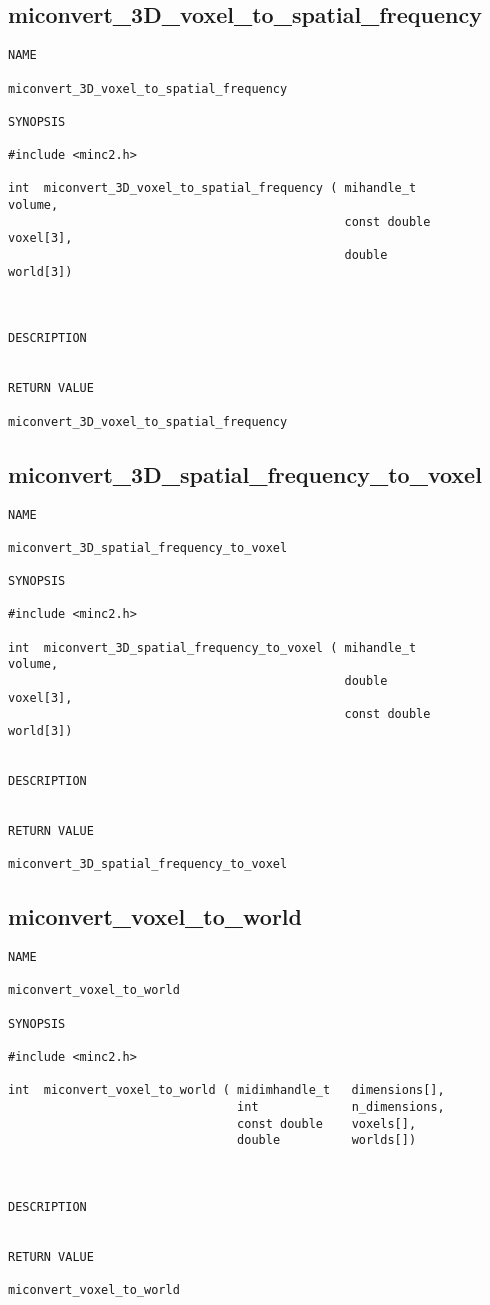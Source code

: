 \documentclass{article}
\begin{document}
\subsection{miconvert\_3D\_voxel\_to\_spatial\_frequency}
\begin{verbatim}
NAME 

miconvert_3D_voxel_to_spatial_frequency

SYNOPSIS

#include <minc2.h>

int  miconvert_3D_voxel_to_spatial_frequency ( mihandle_t            volume,
                                               const double          voxel[3],
                                               double                world[3])
                                   
                       
                                
DESCRIPTION


RETURN VALUE

miconvert_3D_voxel_to_spatial_frequency
\end{verbatim}

\subsection{miconvert\_3D\_spatial\_frequency\_to\_voxel}
\begin{verbatim}
NAME 

miconvert_3D_spatial_frequency_to_voxel

SYNOPSIS

#include <minc2.h>

int  miconvert_3D_spatial_frequency_to_voxel ( mihandle_t            volume,
                                               double                voxel[3],
                                               const double          world[3])
                       
                                
DESCRIPTION


RETURN VALUE

miconvert_3D_spatial_frequency_to_voxel
\end{verbatim}

\subsection{miconvert\_voxel\_to\_world}
\begin{verbatim}
NAME 

miconvert_voxel_to_world

SYNOPSIS

#include <minc2.h>

int  miconvert_voxel_to_world ( midimhandle_t   dimensions[],
                                int             n_dimensions,
                                const double    voxels[],
                                double          worlds[])
                                   
                       
                                
DESCRIPTION


RETURN VALUE

miconvert_voxel_to_world
\end{verbatim}
\end{document}
